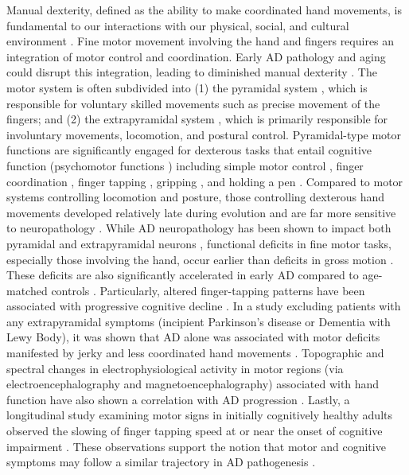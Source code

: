 \documentclass[review,3p,times,12pt,letterpaper]{elsarticle}
\begin{document}
Manual dexterity, defined as the ability to make coordinated hand movements, is fundamental to our interactions with our physical, social, and cultural environment \cite{kreutzer_manual_2011}. Fine motor movement involving the hand and fingers requires an integration of motor control and coordination. Early AD pathology and aging could disrupt this integration, leading to diminished manual dexterity \cite{liou_hand_2020}. The motor system is often subdivided into (1) the pyramidal system \cite{brooks_motor_1971,braak_ratio_1986}, which is responsible for voluntary skilled movements such as precise movement of the fingers; and (2) the extrapyramidal system \cite{de_oliveira-souza_unbearable_2012}, which is primarily responsible for involuntary movements,  locomotion, and postural control. Pyramidal-type motor functions are significantly engaged for dexterous tasks that entail cognitive function (psychomotor functions \cite{hindmarch_psychomotor_1981}) including simple motor control \cite{smith_critical_1999}, finger coordination \cite{shinohara_effects_2003}, finger tapping \cite{ruff_gender-_1993}, gripping \cite{frederiksen_age_2006}, and holding a pen \cite{brooks_motor_1971}. Compared to motor systems controlling locomotion and posture, those controlling dexterous hand movements developed relatively late during evolution and are far more sensitive to neuropathology \cite{isa_dexterous_2019}. While AD neuropathology has been shown to impact both pyramidal and extrapyramidal neurons \cite{braak_ratio_1986,mann_pyramidal_1996,yan_alzheimers_2008,albers_at_2015}, functional deficits in fine motor tasks, especially those involving the hand, occur earlier than deficits in gross motion \cite{smith_aging_1999,hoogendam_older_2014}. These deficits are also significantly accelerated in early AD compared to age-matched controls \cite{smith_critical_1999,ward_age-related_2003,yan_alzheimers_2008,de_paula_impairment_2016}. Particularly, altered finger-tapping patterns have been associated with progressive cognitive decline \cite{camicioli_motor_1998,wilson_parkinsonianlike_2003,roalf_quantitative_2018}. In a study excluding patients with any extrapyramidal symptoms (incipient Parkinson’s disease or Dementia with Lewy Body), it was shown that AD alone was associated with motor deficits manifested by jerky and less coordinated hand movements \cite{goldman_motor_1999}. Topographic and spectral changes in electrophysiological activity in motor regions (via electroencephalography and magnetoencephalography) associated with hand function have also shown a correlation with AD progression \cite{babiloni_mapping_2004,salustri_sensorimotor_2013}. Lastly, a longitudinal study examining motor signs in initially cognitively healthy adults observed the slowing of finger tapping speed at or near the onset of cognitive impairment \cite{buracchio_trajectory_2010}. These observations support the notion that motor and cognitive symptoms may follow a similar trajectory in AD pathogenesis \cite{kluger_motorpsychomotor_1997,vidoni_evidence_2012}. 
\end{document}
